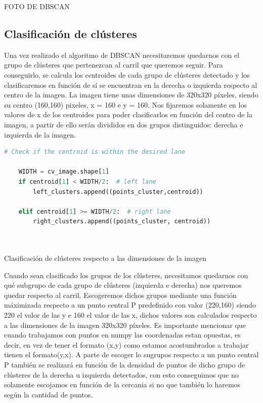 FOTO DE DBSCAN

\subsection{Clasificación de clústeres}
\label{clasificación:cluster}
Una vez realizado el algoritmo de DBSCAN necesitaremos quedarnos con el grupo de clústeres que pertenezcan al carril que queremos seguir. Para conseguirlo, se calcula los centroides de cada
grupo de clústeres detectado y los clasificaremos en función de sí se encuentran en la derecha o izquierda respecto al centro de la imagen. La imagen tiene unas dimensiones de 320x320 píxeles, 
siendo su centro (160,160) pixeles, x = 160 e y = 160. Nos fijaremos solamente en los valores de x de los centroides para poder clasificarlos en función del centro de la 
imagen, a partir de ello serán divididos en dos grupos distinguidos: derecha e izquierda de la imagen. \newline

\begin{code}[h]
  \begin{lstlisting}[language=Python]
    # Check if the centroid is within the desired lane

    WIDTH = cv_image.shape[1]
    if centroid[1] < WIDTH/2:  # left lane
        left_clusters.append((points_cluster,centroid))
       
    elif centroid[1] >= WIDTH/2:  # right lane
        right_clusters.append((points_cluster, centroid))
       
  
  \end{lstlisting}
  \caption[Clasificación de clústeres según las dimensiones de la imagen ]{Clasificación de clústeres respecto a las dimensiones de la imagen}
  \label{cod:Clasificación de clústeres}
  \end{code}  


Cuando sean clasificado los grupos de los clústeres, necesitamos quedarnos con qué subgrupo de cada grupo de clústeres (izquierda e derecha) nos queremos quedar respecto al carril. Escogeremos dichos grupos mediante una función máximizada
respecto a un punto central P predefinido con valor (220,160) siendo 220 el valor de las y e 160 el valor de las x, dichos valores son calculados respecto 
a las dimensiones de la imagen 320x320 píxeles. Es importante mencionar que cuando trabajamos con puntos en numpy las coordenadas estan opuestas, es decir, en vez de tener el formato (x,y) como estamos acostumbrados a trabajar tienen el formato(y,x). 
A parte de escoger lo sugrupos respecto a un punto central P también se realizará en función de la densidad de puntos de dicho grupo de clústeres de la derecha u izquierda detectados, con
esto conseguimos que no solamente escojamos en función de la cercania si no que también lo haremos según la cantidad de puntos. \newline

